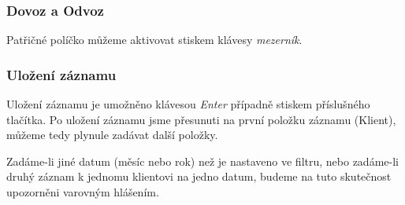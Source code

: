 \documentclass[12pt]{article}
\newcommand{\kl}[1]{\emph{#1}}
\begin{document}
\subsubsection{Dovoz a Odvoz}
Patřičné políčko můžeme aktivovat stiskem klávesy \kl{mezerník}.

\subsubsection{Uložení záznamu}
Uložení záznamu je umožněno klávesou \kl{Enter} případně stiskem příslušného tlačítka. Po uložení
záznamu jsme přesunuti na první položku záznamu (Klient), můžeme tedy plynule zadávat další položky.

Zadáme-li jiné datum (měsíc nebo rok) než je nastaveno ve filtru, nebo zadáme-li druhý záznam k jednomu
klientovi na jedno datum, budeme na tuto skutečnost upozorněni varovným hlášením.
\end{document}
